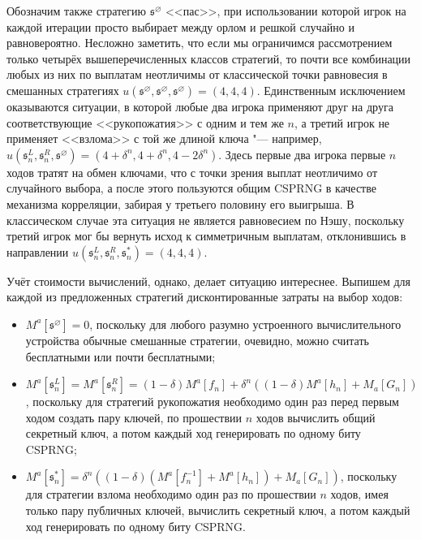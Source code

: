Обозначим также стратегию $\mathfrak{s}^{\varnothing}$ <<пас>>, при использовании которой игрок на каждой итерации просто выбирает между орлом и решкой случайно и равновероятно. Несложно заметить, что если мы ограничимся рассмотрением только четырёх вышеперечисленных классов стратегий, то почти все комбинации любых из них по выплатам неотличимы от классической точки равновесия в смешанных стратегиях $u(\mathfrak{s}^{\varnothing}, \mathfrak{s}^{\varnothing}, \mathfrak{s}^{\varnothing}) = (4, 4, 4)$. Единственным исключением оказываются ситуации, в которой любые два игрока применяют друг на друга соответствующие <<рукопожатия>> с одним и тем же $n$, а третий игрок не применяет <<взлома>> с той же длиной ключа "--- например, $u(\mathfrak{s}^L_n, \mathfrak{s}^R_n, \mathfrak{s}^{\varnothing}) = (4 + \delta^n, 4 + \delta^n, 4 - 2 \delta^n)$. Здесь первые два игрока первые $n$ ходов тратят на обмен ключами, что с точки зрения выплат неотличимо от случайного выбора, а после этого пользуются общим CSPRNG в качестве механизма корреляции, забирая у третьего половину его выигрыша. В классическом случае эта ситуация не является равновесием по Нэшу, поскольку третий игрок мог бы вернуть исход к симметричным выплатам, отклонившись в направлении $u(\mathfrak{s}^L_n, \mathfrak{s}^R_n, \mathfrak{s}^*_n) = (4, 4, 4)$.

Учёт стоимости вычислений, однако, делает ситуацию интереснее. Выпишем для каждой из предложенных стратегий дисконтированные затраты на выбор ходов:
\begin{itemize}
	\item $M^a[\mathfrak{s}^{\varnothing}] = 0$, поскольку для любого разумно устроенного вычислительного устройства обычные смешанные стратегии, очевидно, можно считать бесплатными или почти бесплатными;
	\item $M^a[\mathfrak{s}^L_n] = M^a[\mathfrak{s}^R_n] = (1 - \delta) M^a[f_n] + \delta ^ n ((1 - \delta) M^a[h_n] + M_a[G_n])$, поскольку для стратегий рукопожатия необходимо один раз перед первым ходом создать пару ключей, по прошествии $n$ ходов вычислить общий секретный ключ, а потом каждый ход генерировать по одному биту CSPRNG;
	\item $M^a[\mathfrak{s}^*_n] = \delta ^ n ((1 - \delta) (M^a[f_n^{-1}] + M^a[h_n]) + M_a[G_n])$, поскольку для стратегии взлома необходимо один раз по прошествии $n$ ходов, имея только пару публичных ключей, вычислить секретный ключ, а потом каждый ход генерировать по одному биту CSPRNG.
\end{itemize}

